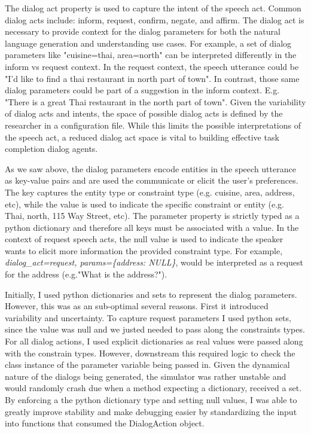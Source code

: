 The dialog act property is used to capture the intent of the speech act. Common dialog acts include: inform, request, confirm, negate, and affirm. The dialog act is necessary to provide context for the dialog parameters for both the natural language generation and understanding use cases. For example, a set of dialog parameters like "{cuisine=thai, area=north}" can be interpreted differently in the inform vs request context. In the request context, the speech utterance could be "I'd like to find a thai restaurant in north part of town". In contrast, those same dialog parameters could be part of a suggestion in the inform context. E.g. "There is a great Thai restaurant in the north part of town". Given the variability of dialog acts and intents, the space of possible dialog acts is defined by the researcher in a configuration file. While this limits the possible interpretations of the speech act, a reduced dialog act space is vital to building effective task completion dialog agents.  

As we saw above, the dialog parameters encode entities in the speech utterance as key-value pairs and are used the communicate  or elicit the user's preferences. The key captures the entity type or constraint type (e.g. cuisine, area, address, etc), while the value is used to indicate the specific constraint or entity (e.g. Thai, north, 115 Way Street, etc). The parameter property is strictly typed as a python dictionary and therefore all keys must be associated with a value. In the context of request speech acts, the null value is used to indicate the speaker wants to elicit more information the provided constraint type. For example, \textit{dialog\_act=request, params=\{address: NULL\}}, would be interpreted as a request for the address (e.g."What is the address?"). 

Initially, I used python dictionaries and sets to represent the dialog parameters. However, this was as an sub-optimal several reasons. First it introduced variability and uncertainty. To capture request parameters I used python sets, since the value was null and we justed needed to pass along the constraints types. For all dialog actions, I used explicit dictionaries as real values were passed along with the constrain types. However, downstream this required logic to check the class instance of the parameter variable being passed in. Given the dynamical nature of the dialogs being generated, the simulator was rather unstable and would randomly crash due when a method expecting a dictionary, received a set. By enforcing a the python dictionary type and setting null values, I was able to greatly improve stability and make debugging easier by standardizing the input into functions that consumed the DialogAction object. 

